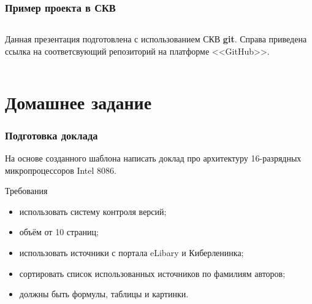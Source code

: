 \documentclass[aspectratio=169]{beamer}
\begin{document}
\begin{frame}
\frametitle{Пример проекта в СКВ}
\medskip
\begin{columns}
Данная презентация подготовлена с использованием СКВ \textbf{git}. Справа приведена ссылка на соответсвующий репозиторий на платформе <<GitHub>>.
\end{columns}
\end{frame}

\section{Домашнее задание}

\begin{frame}
\frametitle{Подготовка доклада}
На основе созданного шаблона написать доклад про архитектуру 16-разрядных микропроцессоров Intel 8086.
\begin{exampleblock}{Требования}
\begin{itemize}
\item использовать систему контроля версий;
\item объём от 10 страниц;
\item использовать источники с портала eLibary и Киберленинка;
\item сортировать список использованных источников по фамилиям авторов;
\item должны быть формулы, таблицы и картинки.
\end{itemize}
\end{exampleblock}
\end{frame}
\end{document}
